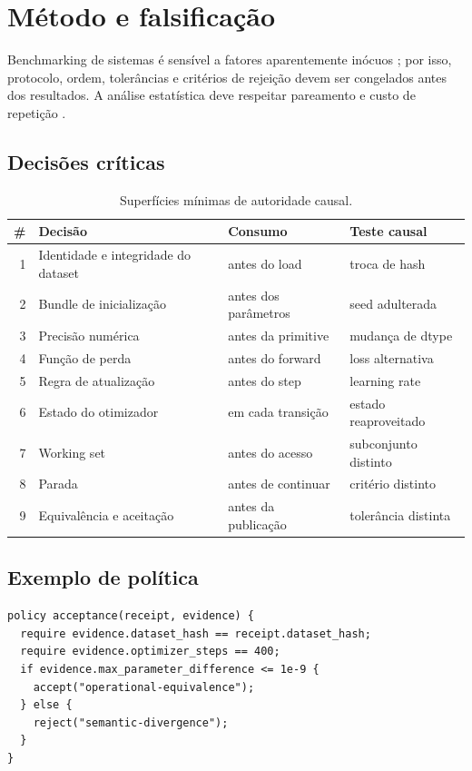 \chapter{Método e falsificação}
\label{chap:metodo}

Benchmarking de sistemas é sensível a fatores aparentemente inócuos
\parencite{mytkowicz2009wrongdata}; por isso, protocolo, ordem, tolerâncias e
critérios de rejeição devem ser congelados antes dos resultados. A análise
estatística deve respeitar pareamento e custo de repetição
\parencite{kalibera2013rigorous}.

\section{Decisões críticas}

\begin{table}[htbp]
\caption{Superfícies mínimas de autoridade causal.}
\label{tab:decisoes}
\centering
\begin{tabularx}{\textwidth}{@{}rXll@{}}
\toprule
\# & Decisão & Consumo & Teste causal \\
\midrule
1 & Identidade e integridade do dataset & antes do load & troca de hash \\
2 & Bundle de inicialização & antes dos parâmetros & seed adulterada \\
3 & Precisão numérica & antes da primitive & mudança de dtype \\
4 & Função de perda & antes do forward & loss alternativa \\
5 & Regra de atualização & antes do step & learning rate \\
6 & Estado do otimizador & em cada transição & estado reaproveitado \\
7 & Working set & antes do acesso & subconjunto distinto \\
8 & Parada & antes de continuar & critério distinto \\
9 & Equivalência e aceitação & antes da publicação & tolerância distinta \\
\bottomrule
\end{tabularx}
\end{table}

\section{Exemplo de política}

\begin{lstlisting}[language=TLang,caption={Fragmento ilustrativo; substituir por
fonte T real e hashada no manuscrito final.},label={lst:policy}]
policy acceptance(receipt, evidence) {
  require evidence.dataset_hash == receipt.dataset_hash;
  require evidence.optimizer_steps == 400;
  if evidence.max_parameter_difference <= 1e-9 {
    accept("operational-equivalence");
  } else {
    reject("semantic-divergence");
  }
}
\end{lstlisting}
